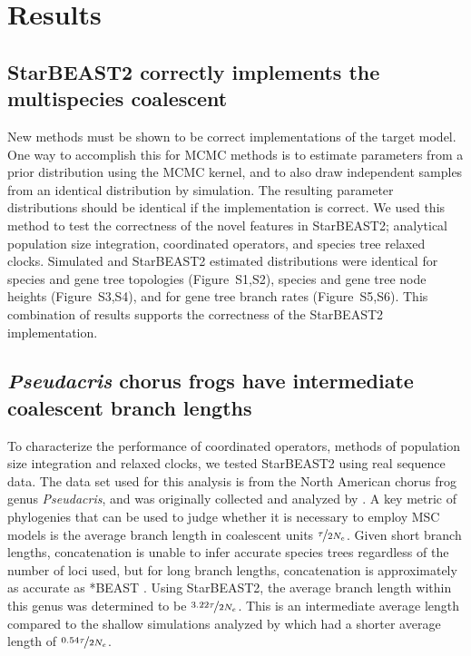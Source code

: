 \documentclass[nogrid]{MBE}%
\begin{document}
\section{Results}

\subsection{StarBEAST2 correctly implements the multispecies coalescent}

New methods must be shown to be correct implementations of the
target model. One way to accomplish this for MCMC methods is to estimate
parameters from a prior distribution using the MCMC kernel, and to also draw
independent samples from an identical distribution by simulation. The resulting
parameter distributions should be identical if the implementation is correct. We
used this method to test the correctness of the novel features in StarBEAST2;
analytical population size integration, coordinated operators, and species tree
relaxed clocks. Simulated and StarBEAST2 estimated distributions were identical
for species and gene tree topologies (Figure~S1,S2), species and gene tree node
heights (Figure~S3,S4), and for gene tree branch rates (Figure~S5,S6). This
combination of results supports the correctness of the StarBEAST2
implementation.

\subsection{\textit{Pseudacris} chorus frogs have intermediate coalescent branch lengths}

To characterize the performance of coordinated operators, methods of population size
integration and relaxed clocks, we tested StarBEAST2 using real sequence data.
The data set used for this analysis is from the North American chorus frog genus
\textit{Pseudacris}, and was originally collected and analyzed by
\cite{Barrow201478}. A key metric of phylogenies that can be used to judge
whether it is necessary to employ MSC models is the average
branch length in coalescent units $\nicefrac{\tau}{2N_e}$. Given short branch
lengths, concatenation is unable to infer accurate species trees regardless of
the number of loci used, but for long branch lengths, concatenation is
approximately as accurate as *BEAST \citep{Ogilvie01052016}. Using StarBEAST2,
the average branch length within this genus was determined to be
$\nicefrac{3.22\tau}{2N_e}$. This is an intermediate average length compared to
the shallow simulations analyzed by \cite{Ogilvie01052016} which had a shorter
average length of $\nicefrac{0.54\tau}{2N_e}$.
\end{document}
